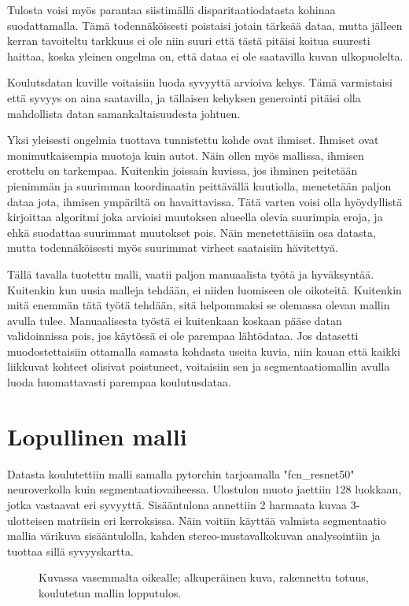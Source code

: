 Tulosta voisi myös parantaa siistimällä disparitaatiodatasta kohinaa suodattamalla.
Tämä todennäköisesti poistaisi jotain tärkeää dataa,
mutta jälleen kerran tavoiteltu tarkkuus ei ole niin suuri että tästä pitäisi koitua suuresti haittaa,
koska yleinen ongelma on, että dataa ei ole saatavilla kuvan ulkopuolelta.

Koulutsdatan kuville voitaisiin luoda syvyyttä arvioiva kehys.
Tämä varmistaisi että syvyys on aina saatavilla, 
ja tällaisen kehyksen generointi pitäisi olla mahdollista datan samankaltaisuudesta johtuen.

Yksi yleisesti ongelmia tuottava tunnistettu kohde ovat ihmiset.
Ihmiset ovat monimutkaisempia muotoja kuin autot.
Näin ollen myös mallissa, ihmisen erottelu on tarkempaa.
Kuitenkin joissain kuvissa,
jos ihminen peitetään pienimmän ja suurimman koordinaatin peittävällä kuutiolla,
menetetään paljon dataa jota, ihmisen ympäriltä on havaittavissa.
Tätä varten voisi olla hyöydyllistä kirjoittaa algoritmi joka arvioisi muutoksen alueella olevia suurimpia eroja,
ja ehkä suodattaa suurimmat muutokset pois. Näin menetettäisiin osa datasta,
mutta todennäköisesti myös suurimmat virheet saataisiin hävitettyä. 

Tällä tavalla tuotettu malli, vaatii paljon manuaalista työtä ja hyväksyntää.
Kuitenkin kun uusia malleja tehdään, ei niiden luomiseen ole oikoteitä.
Kuitenkin mitä enemmän tätä työtä tehdään,
sitä helpommaksi se olemassa olevan mallin avulla tulee.
Manuaalisesta työstä ei kuitenkaan koskaan pääse datan validoinnissa pois,
jos käytössä ei ole parempaa lähtödataa.
Jos datasetti muodostettaisiin ottamalla samasta kohdasta useita kuvia,
niin kauan että kaikki liikkuvat kohteet olisivat poistuneet,
voitaisiin sen ja segmentaatiomallin avulla luoda huomattavasti parempaa koulutusdataa. 

\section{Lopullinen malli}

Datasta koulutettiin malli samalla pytorchin tarjoamalla "fcn\_resnet50" \cite{pytorchfcnresnet50} neuroverkolla kuin segmentaatiovaiheessa.
Ulostulon muoto jaettiin 128 luokkaan, jotka vastaavat eri syvyyttä.
Sisääntulona annettiin 2 harmaata kuvaa 3-ulotteisen matriisin eri kerroksissa.
Näin voitiin käyttää valmista segmentaatio mallia värikuva sisääntulolla, kahden stereo-mustavalkokuvan analysointiin ja tuottaa sillä syvyyskartta.

\begin{figure}[h]
\centering
{}
\caption{Kuvassa vasemmalta oikealle; alkuperäinen kuva, rakennettu totuus, koulutetun mallin lopputulos.}
\label{fig:model}
\end{figure}



